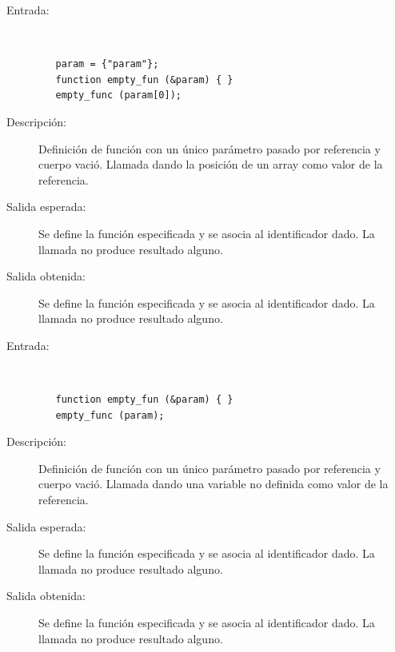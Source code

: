 \begin{framed}
	\begin{description}
		\item [Entrada:] \hfill \\
\begin{lstlisting}
   param = {"param"};
   function empty_fun (&param) { } 
   empty_func (param[0]);
\end{lstlisting}
		\item [Descripción:] Definición de función con un único parámetro pasado por referencia y cuerpo vació. Llamada dando la posición de un array como valor de la referencia.
		\item [Salida esperada:] Se define la función especificada y se asocia al identificador dado. La llamada no produce resultado alguno.
		\item [Salida obtenida:] Se define la función especificada y se asocia al identificador dado. La llamada no produce resultado alguno.
	\end{description}
\end{framed}

\begin{framed}
	\begin{description}
		\item [Entrada:] \hfill \\
\begin{lstlisting}
   function empty_fun (&param) { } 
   empty_func (param);
\end{lstlisting}
		\item [Descripción:] Definición de función con un único parámetro pasado por referencia y cuerpo vació. Llamada dando una variable no definida como valor de la referencia.
		\item [Salida esperada:] Se define la función especificada y se asocia al identificador dado. La llamada no produce resultado alguno.
		\item [Salida obtenida:] Se define la función especificada y se asocia al identificador dado. La llamada no produce resultado alguno.
	\end{description}
\end{framed}

